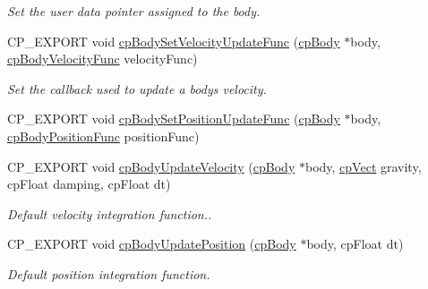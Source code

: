 \begin{DoxyCompactItemize}
\begin{DoxyCompactList}\small\item\em Set the user data pointer assigned to the body. \end{DoxyCompactList}\item 
\mbox{\label{group__cpBody_gafb735af90ab6087215af8efbebca771c}} 
C\+P\+\_\+\+E\+X\+P\+O\+RT void \hyperlink{group__cpBody_gafb735af90ab6087215af8efbebca771c}{cp\+Body\+Set\+Velocity\+Update\+Func} (\hyperlink{structcpBody}{cp\+Body} $\ast$body, \hyperlink{group__cpBody_gaa7a1f4706fb8e879c356ae99035ead71}{cp\+Body\+Velocity\+Func} velocity\+Func)
\begin{DoxyCompactList}\small\item\em Set the callback used to update a body\textquotesingle{}s velocity. \end{DoxyCompactList}\item 
C\+P\+\_\+\+E\+X\+P\+O\+RT void \hyperlink{group__cpBody_gaa3c5a0ad4bfa91f4e24fb558c743fdba}{cp\+Body\+Set\+Position\+Update\+Func} (\hyperlink{structcpBody}{cp\+Body} $\ast$body, \hyperlink{group__cpBody_ga3386e3b0b4156289ab6099cc64c952e7}{cp\+Body\+Position\+Func} position\+Func)
\item 
\mbox{\label{group__cpBody_ga159fab7ed8170ccba8cfe66a9c97a4ac}} 
C\+P\+\_\+\+E\+X\+P\+O\+RT void \hyperlink{group__cpBody_ga159fab7ed8170ccba8cfe66a9c97a4ac}{cp\+Body\+Update\+Velocity} (\hyperlink{structcpBody}{cp\+Body} $\ast$body, \hyperlink{structcpVect}{cp\+Vect} gravity, cp\+Float damping, cp\+Float dt)
\begin{DoxyCompactList}\small\item\em Default velocity integration function.. \end{DoxyCompactList}\item 
\mbox{\label{group__cpBody_ga20c279044f835290b0eb24dd4ff451ac}} 
C\+P\+\_\+\+E\+X\+P\+O\+RT void \hyperlink{group__cpBody_ga20c279044f835290b0eb24dd4ff451ac}{cp\+Body\+Update\+Position} (\hyperlink{structcpBody}{cp\+Body} $\ast$body, cp\+Float dt)
\begin{DoxyCompactList}\small\item\em Default position integration function. \end{DoxyCompactList}\item 
\mbox{\label{group__cpBody_ga35e470ae1d4c0df38fe7145d029f8399}} 

\end{DoxyCompactItemize}
